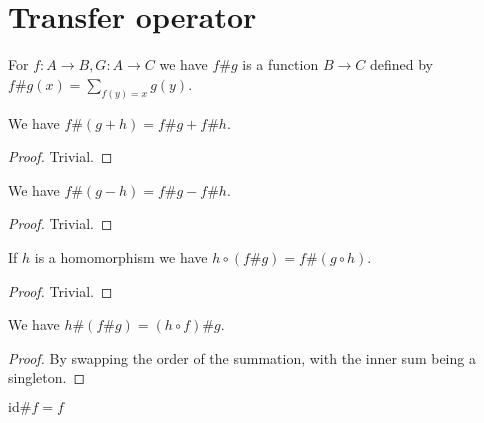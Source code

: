 \chapter{Transfer operator}
\label{chap:transfer}

\begin{definition}
    \label{transfer}
    \leanok
    For $f : A \to B, G : A \to C$ we have $f \# g$ is a function $B \to C$ defined by
    $f \# g(x) = \sum_{f(y) = x}g(y)$.
\end{definition}

\begin{lemma}
    \label{transfer_add}
    \leanok
    We have $f \# (g + h) = f \# g + f \# h$.
\end{lemma}

\begin{proof}
    \leanok
    Trivial.
\end{proof}

\begin{lemma}
    \label{transfer_sub}
    \leanok
    We have $f \# (g - h) = f \# g - f \# h$.
\end{lemma}
\begin{proof}
    \leanok
    Trivial.
\end{proof}

\begin{lemma}
    \label{comp_transfer}
    \leanok
    If $h$ is a homomorphism we have $h \circ (f \# g) = f \# (g \circ h)$.
\end{lemma}

\begin{proof}
    \leanok
    Trivial.
\end{proof}

\begin{lemma}
    \label{transfer_transfer}
    \leanok
    We have $h \# (f \# g) = (h \circ f) \# g$.
\end{lemma}

\begin{proof}
    \leanok
    By swapping the order of the summation, with the inner sum being a singleton.
\end{proof}

\begin{lemma}
    \label{transfer_id}
    \leanok
    $\mathrm{id} \# f = f$
\end{lemma}

